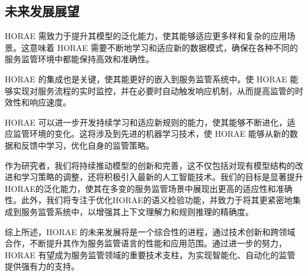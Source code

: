 \subsection{未来发展展望}

HORAE 需致力于提升其模型的泛化能力，使其能够适应更多样和复杂的应用场景。这意味着 HORAE 需要不断地学习和适应新的数据模式，确保在各种不同的服务监管环境中都能保持高效和准确性。

HORAE 的集成也是关键，使其能更好的嵌入到服务监管系统中。使 HORAE 能够实现对服务流程的实时监控，并在必要时自动触发响应机制，从而提高监管的时效性和响应速度。

HORAE 可以进一步开发持续学习和适应新规则的能力，使其能够不断进化，适应监管环境的变化。这将涉及到先进的机器学习技术，使 HORAE 能够从新的数据和反馈中学习，优化自身的监管策略。

作为研究者，我们将持续推动模型的创新和完善，这不仅包括对现有模型结构的改进和学习策略的调整，还将积极引入最新的人工智能技术。我们的目标是显著提升HORAE的泛化能力，使其在多变的服务监管场景中展现出更高的适应性和准确性。此外，我们将专注于优化HORAE的语义检验功能，并致力于将其更紧密地集成到服务监管系统中，以增强其上下文理解力和规则推理的精确度。

综上所述，HORAE 的未来发展将是一个综合性的进程，通过技术创新和跨领域合作，不断提升其作为服务监管语言的性能和应用范围。通过进一步的努力，HORAE 有望成为服务监管领域的重要技术支柱，为实现智能化、自动化的监管提供强有力的支持。